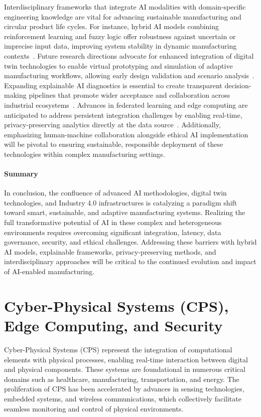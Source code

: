 \documentclass[sigconf]{acmart}
\begin{document}
Interdisciplinary frameworks that integrate AI modalities with domain-specific engineering knowledge are vital for advancing sustainable manufacturing and circular product life cycles. For instance, hybrid AI models combining reinforcement learning and fuzzy logic offer robustness against uncertain or imprecise input data, improving system stability in dynamic manufacturing contexts~\cite{ref29,ref36,ref44}. Future research directions advocate for enhanced integration of digital twin technologies to enable virtual prototyping and simulation of adaptive manufacturing workflows, allowing early design validation and scenario analysis~\cite{ref38}. Expanding explainable AI diagnostics is essential to create transparent decision-making pipelines that promote wider acceptance and collaboration across industrial ecosystems~\cite{ref38}. Advances in federated learning and edge computing are anticipated to address persistent integration challenges by enabling real-time, privacy-preserving analytics directly at the data source~\cite{ref29,ref36}. Additionally, emphasizing human-machine collaboration alongside ethical AI implementation will be pivotal to ensuring sustainable, responsible deployment of these technologies within complex manufacturing settings.

\paragraph{Summary}

In conclusion, the confluence of advanced AI methodologies, digital twin technologies, and Industry 4.0 infrastructures is catalyzing a paradigm shift toward smart, sustainable, and adaptive manufacturing systems. Realizing the full transformative potential of AI in these complex and heterogeneous environments requires overcoming significant integration, latency, data governance, security, and ethical challenges. Addressing these barriers with hybrid AI models, explainable frameworks, privacy-preserving methods, and interdisciplinary approaches will be critical to the continued evolution and impact of AI-enabled manufacturing.

\section{Cyber-Physical Systems (CPS), Edge Computing, and Security}

Cyber-Physical Systems (CPS) represent the integration of computational elements with physical processes, enabling real-time interaction between digital and physical components. These systems are foundational in numerous critical domains such as healthcare, manufacturing, transportation, and energy. The proliferation of CPS has been accelerated by advances in sensing technologies, embedded systems, and wireless communications, which collectively facilitate seamless monitoring and control of physical environments.
\end{document}
